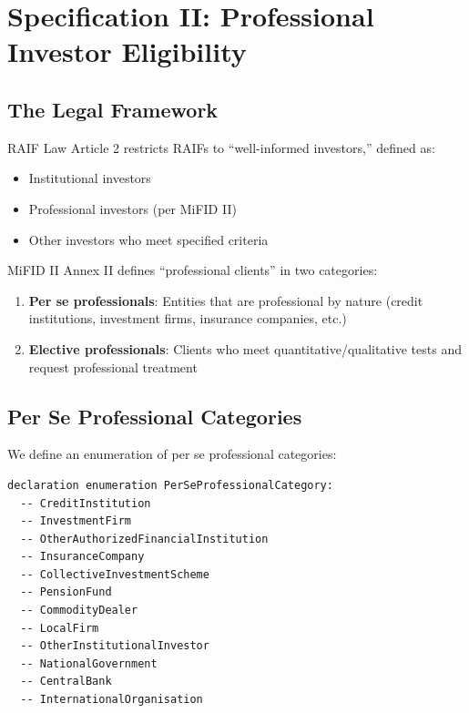 
\section{Specification II: Professional Investor Eligibility}
\label{sec:investor}

\subsection{The Legal Framework}
\label{sec:investor-framework}

RAIF Law Article 2 restricts RAIFs to ``well-informed investors,'' defined as:

\begin{itemize}
  \item Institutional investors
  \item Professional investors (per MiFID II)
  \item Other investors who meet specified criteria
\end{itemize}

MiFID II Annex II defines ``professional clients'' in two categories:

\begin{enumerate}
  \item \textbf{Per se professionals}: Entities that are professional by nature (credit institutions, investment firms, insurance companies, etc.)
  \item \textbf{Elective professionals}: Clients who meet quantitative/qualitative tests and request professional treatment
\end{enumerate}

\subsection{Per Se Professional Categories}
\label{sec:per-se}

We define an enumeration of per se professional categories:

\begin{lstlisting}
declaration enumeration PerSeProfessionalCategory:
  -- CreditInstitution
  -- InvestmentFirm
  -- OtherAuthorizedFinancialInstitution
  -- InsuranceCompany
  -- CollectiveInvestmentScheme
  -- PensionFund
  -- CommodityDealer
  -- LocalFirm
  -- OtherInstitutionalInvestor
  -- NationalGovernment
  -- CentralBank
  -- InternationalOrganisation
\end{lstlisting}

